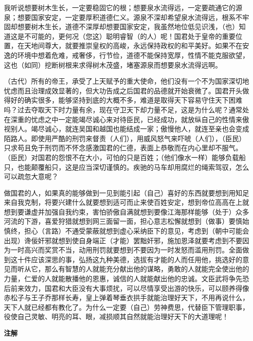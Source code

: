 \documentclass[12pt,UTF-8,openany,a4]{ctexbook}
\begin{document}
\begin{large}
    \yiwen 
    我听说想要树木生长，一定要稳固它的根；想要泉水流得远，一定要疏通它的源泉；想要国家安定，一定要厚积道德仁义。源泉不深却希望泉水流得远，根系不牢固却想要树木生长，道德不深厚却想要国家安定，我虽然地位低见识浅，（也）知道这是不可能的，更何况（您这）聪明睿智（的人）呢！国君处于皇帝的重要位置，在天地间尊大，就要推崇皇权的高峻，永远保持政权的和平美好。如果不在安逸的环境中想着危难，戒奢侈，行节俭，道德不能保持宽厚，性情不能克服欲望，这也（如同）挖断树根来求得树木茂盛，堵塞源泉而想要泉水流得远啊。
    
    （古代）所有的帝王，承受了上天赋予的重大使命，他们没有一个不为国家深切地忧虑而且治理成效显著的，但大功告成之后国君的品德就开始衰微了。国君开头做得好的确实很多，能够坚持到底的大概不多，难道是取得天下容易守住天下困难吗？过去夺取天下时力量有余，现在守卫天下却力量不足，这是为什么呢？通常处在深重的忧虑之中一定能竭尽诚心来对待臣民，已经成功，就放纵自己的性情来傲视别人。竭尽诚心，就连吴国和越国也能结成一家；傲慢他人，就连至亲也会变成陌路人。即使用严酷的刑罚来督责（人们），用威风怒气来吓唬（人们），（臣民）只求苟且免于刑罚而不怀念感激国君的仁德，表面上恭敬而在内心里却不服气。（臣民）对国君的怨恨不在大小，可怕的只是百姓；（他们像水一样）能够负载船只，也能颠覆船只，这是应当深切谨慎的。疾驰的马车却用腐烂的绳索驾驭，怎么可以疏忽大意呢？
    
    做国君的人，如果真的能够做到一见到能引起（自己）喜好的东西就要想到用知足来自我克制，将要兴建什么就要想到适可而止来使百姓安定，想到帝位高高在上就想到要谦虚并加强自我约束，害怕骄傲自满就想到要像江海那样能够（处于）众多河流的下游，喜爱狩猎就想到网三面留一面，担心意志松懈就想到（做事）要慎始慎终，担心（言路）不通受蒙蔽就想到虚心采纳臣下的意见，考虑到（朝中可能会出现）谗佞奸邪就想到使自身端正（才能）罢黜奸邪，施加恩泽就要考虑到不要因为一时高兴而奖赏不当，动用刑罚就要想到不要因为一时发怒而滥用刑罚。全面做到这十件应该深思的事，弘扬这九种美德，选拔有才能的人而任用他，挑选好的意见而听从它，那么有智慧的人就能充分献出他的谋略，勇敢的人就能完全使出他的力量，仁爱的人就能散播他的恩惠，诚信的人就能献出他的忠诚。文臣武将争先恐后前来效力，国君和大臣没有大事烦扰，可以尽情享受出游的快乐，可以颐养得像赤松子与王子乔那样长寿，皇上弹着琴垂衣拱手就能治理好天下，不用再说什么，天下人就已经都有教化了。为什么一定要（自己）劳神费思，代替臣下管理职事，役使自己灵敏、明亮的耳、眼，减损顺其自然就能治理好天下的大道理呢！
    
\end{large}


\newpage

\begin{Large}
    \noindent\textbf{注解}
\end{Large}
\end{document}
